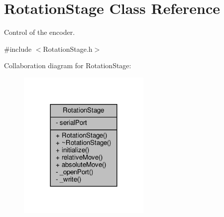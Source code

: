 \hypertarget{class_rotation_stage}{}\section{Rotation\+Stage Class Reference}
\label{class_rotation_stage}


Control of the encoder.  




{\ttfamily \#include $<$Rotation\+Stage.\+h$>$}



Collaboration diagram for Rotation\+Stage\+:\nopagebreak
\begin{figure}[H]
\begin{center}
\leavevmode
\includegraphics[width=180pt]{class_rotation_stage__coll__graph}
\end{center}
\end{figure}
